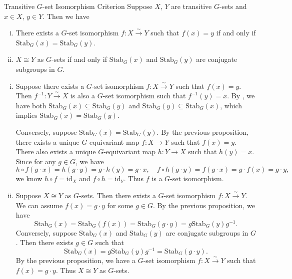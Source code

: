 \begin{proposition}{Transitive $G$-set Isomorphism Criterion}{}
    Suppose $X$, $Y$ are transitive $G$-sets and $x\in X$, $y\in Y$. Then we have
    \begin{enumerate}[(i)]
        \item There exists a $G$-set isomorphism $f:X\xrightarrow{\sim} Y$ such that $f(x)=y$ if and only if $\mathrm{Stab}_G(x)=\mathrm{Stab}_G(y)$.
        \item $X\cong Y$ as $G$-sets if and only if $\mathrm{Stab}_G(x)$ and $\mathrm{Stab}_G(y)$ are conjugate subgroups in $G$.
    \end{enumerate}
    
\end{proposition}
\begin{prf}
    \begin{enumerate}[(i)]
        \item Suppose there exists a $G$-set isomorphism $f:X\xrightarrow{\sim} Y$ such that $f(x)=y$. Then $f^{-1}:Y\xrightarrow{\sim} X$ is also a $G$-set isomorphism such that $f^{-1}(y)=x$. By , we have both $\mathrm{Stab}_G(x)\subseteq \mathrm{Stab}_G(y)$ and $\mathrm{Stab}_G(y)\subseteq \mathrm{Stab}_G(x)$, which implies $\mathrm{Stab}_G(x)=\mathrm{Stab}_G(y)$.

        Conversely, suppose $\mathrm{Stab}_G(x)=\mathrm{Stab}_G(y)$. By the previous proposition, there exists a unique $G$-equivariant map $f:X\to Y$ such that $f(x)=y$. There also exists a unique $G$-equivariant map $h:Y\to X$ such that $h(y)=x$. Since for any $g\in G$, we have
        \[ 
            h\circ f(g\cdot x)=h(g \cdot y)=g \cdot h(y)=g\cdot x,\quad f\circ h(g\cdot y)=f(g\cdot x)=g\cdot f(x)=g\cdot y,
        \]
        we know $h\circ f=\mathrm{id}_X$ and $f\circ h=\mathrm{id}_Y$. Thus $f$ is a $G$-set isomorphism.
        \item Suppose $X\cong Y$ as $G$-sets. Then there exists a $G$-set isomorphism $f:X\xrightarrow{\sim} Y$. We can assume $f(x)=g\cdot y$ for some $g\in G$. By the previous proposition, we have
        \[
            \mathrm{Stab}_G(x)=\mathrm{Stab}_G(f(x))=\mathrm{Stab}_G(g\cdot y)=g\mathrm{Stab}_G(y)g^{-1}.
        \]
        Conversely, suppose $\mathrm{Stab}_G(x)$ and $\mathrm{Stab}_G(y)$ are conjugate subgroups in $G$. Then there exists $g\in G$ such that
        \[
            \mathrm{Stab}_G(x)=g\mathrm{Stab}_G(y)g^{-1}=\mathrm{Stab}_G(g\cdot y).
        \]
        By the previous proposition, we have a $G$-set isomorphism $f:X\xrightarrow{\sim} Y$ such that $f(x)=g\cdot y$. Thus $X\cong Y$ as $G$-sets.
    \end{enumerate}
\end{prf}

